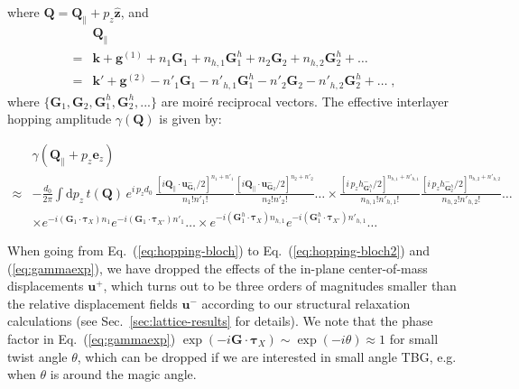 \documentclass[aps,prx,10pt,twocolumn,superscriptaddress]{revtex4}
\begin{document}
where $\textbf{Q}\!=\!\textbf{Q}_{\parallel}+p_{z}\hat{\mathbf{z}}$, and 
\begin{equation}
\begin{split}
&\textbf{Q}_{\parallel}\\
=&\textbf{k}+\textbf{g}^{(1)}+n_{1}\textbf{G}_{1}+n_{h,1}\textbf{G}^{h}_{1}+n_{2}\textbf{G}_{2}+n_{h,2}\textbf{G}^{h}_{2}+\dots\\
=&\textbf{k}'+\textbf{g}^{(2)}-n'_{1}\textbf{G}_{1}-n'_{h,1}\textbf{G}^{h}_{1}-n'_{2}\textbf{G}_{2}-n'_{h,2}\textbf{G}^{h}_{2}+\dots\;,
\end{split}
\end{equation}
where $\{\mathbf{G}_1,\mathbf{G}_2,\mathbf{G}^{h}_1,\mathbf{G}^{h}_2,...\}$ are moir\'e reciprocal vectors.
The effective interlayer hopping amplitude $\gamma(\textbf{Q})$ is given by:
\begin{widetext}
\begin{equation}
\label{eq:gammaexp}
\begin{split}
&\gamma(\textbf{Q}_{\parallel}+p_{z}\textbf{e}_{z})\\
\approx&-\frac{d_{0}}{2\pi}\int\mathrm{d}p_{z}\,t(\textbf{Q})\,e^{i\,p_{z}d_{0}}\,\frac{\left[i\textbf{Q}_{\parallel}\cdot\textbf{u}^{-}_{\textbf{G}_{1}}/2\right]^{n_{1}+n'_{1}}}{n_{1}!n'_{1}!}\frac{\left[i\textbf{Q}_{\parallel}\cdot\textbf{u}^{-}_{\textbf{G}_{2}}/2\right]^{n_{2}+n'_{2}}}{n_{2}!n'_{2}!}\dots\times\frac{\left[i\,p_{z}h^{-}_{\textbf{G}^{h}_{1}}/2\right]^{n_{h,1}+n'_{h,1}}}{n_{h,1}!n'_{h,1}!}\frac{\left[i\,p_{z}h^{-}_{\textbf{G}^{h}_{2}}/2\right]^{n_{h,2}+n'_{h,2}}}{n_{h,2}!n'_{h,2}!}\dots\\
& \times e^{-i(\textbf{G}_{1}\cdot\bm{\tau}_{X})n_{1}}e^{-i(\textbf{G}_{1}\cdot\bm{\tau}_{X'})n'_{1}}\dots\times e^{-i(\textbf{G}^{h}_{1}\cdot\bm{\tau}_{X})n_{h,1}}e^{-i(\textbf{G}^{h}_{1}\cdot\bm{\tau}_{X'})n'_{h,1}}\dots%
\end{split}
\end{equation}
\end{widetext}
When going from Eq.~(\ref{eq:hopping-bloch}) to Eq.~(\ref{eq:hopping-bloch2}) and (\ref{eq:gammaexp}), we have dropped the effects of the in-plane center-of-mass displacements $\mathbf{u}^{+}$, which turns out to be three orders of magnitudes smaller than the relative displacement fields $\mathbf{u}^{-}$ according to our structural relaxation calculations (see Sec.~\ref{sec:lattice-results} for details).
We note that the phase factor in Eq.~(\ref{eq:gammaexp}) $\exp(-i\textbf{G}\cdot\bm{\tau}_X)\sim\exp(-i\theta)\approx 1$ for small twist angle $\theta$, which can be dropped if we are interested in small angle TBG, e.g. when $\theta$ is around the magic angle.
\end{document}
